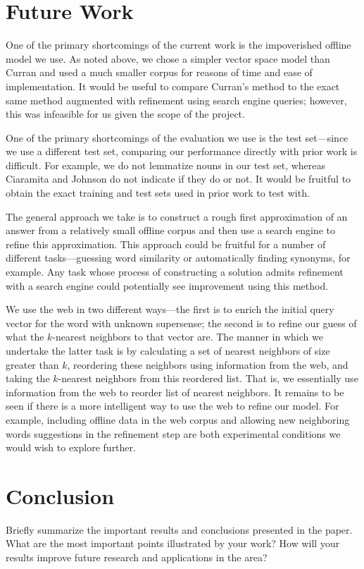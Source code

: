 \documentclass{article}
\begin{document}
\section{Future Work}


One of the primary shortcomings of the current work is the impoverished offline model we use.
As noted above, we chose a simpler vector space model than Curran \cite{curran} and used a much smaller corpus for reasons of time and ease of implementation.
It would be useful to compare Curran's method to the exact same method augmented with refinement using search engine queries; however, this was infeasible for us given the scope of the project.

One of the primary shortcomings of the evaluation we use is the test set---since we use a different test set, comparing our performance directly with prior work is difficult.
For example, we do not lemmatize nouns in our test set, whereas Ciaramita and Johnson \cite{cj} do not indicate if they do or not.
It would be fruitful to obtain the exact training and test sets used in prior work to test with.

The general approach we take is to construct a rough first approximation of an answer from a relatively small offline corpus and then use a search engine to refine this approximation.
This approach could be fruitful for a number of different tasks---guessing word similarity or automatically finding synonyms, for example.
Any task whose process of constructing a solution admits refinement with a search engine  could potentially see improvement using this method.

We use the web in two different ways---the first is to enrich the initial query vector for the word with unknown supersense; the second is to refine our guess of what the $k$-nearest neighbors to that vector are.
The manner in which we undertake the latter task is by calculating a set of nearest neighbors of size greater than $k$, reordering these neighbors using information from the web, and taking the $k$-nearest neighbors from this reordered list.
That is, we essentially use information from the web to reorder list of nearest neighbors.
It remains to be seen if there is a more intelligent way to use the web to  refine our model.
For example, including offline data in the web corpus and allowing new neighboring words suggestions in the refinement step are both experimental conditions we would wish to explore further.

\section{Conclusion}

Briefly summarize the important results and conclusions presented in the paper. What are the most important points illustrated by your work? How will your results improve future research and applications in the area? 




{}

\end{document}
